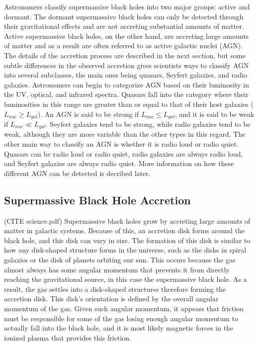 \documentclass[12pt]{article}
\begin{document}
Astronomers classify supermassive black holes into two major groups: active and
dormant.  The dormant supermassive black holes can only be detected through
their gravitational effects and are not accreting substantial amounts of matter.
Active supermassive black holes, on the other hand, are accreting large amounts
of matter and as a result are often referred to as active galactic nuclei (AGN).
The details of the accretion process are described in the next section, but some
subtle differences in the observed accretion gives scientists ways to classify
AGN into several subclasses, the main ones being quasars, Seyfert galaxies, and
radio galaxies.  Astronomers can begin to categorize AGN based on their
luminosity in the UV, optical, and infrared spectra.  Quasars fall into the
category where their luminosities in this range are greater than or equal to
that of their host galaxies ($L_{nuc} \ge L_{gal}$).  An AGN is said to be
strong if $L_{nuc} \le L_{gal}$, and it is said to be weak if $L_{nuc} \ll
L_{gal}$.  Seyfert galaxies tend to be strong, while radio galaxies tend to be
weak, although they are more variable than the other types in this regard.  The
other main way to classify an AGN is whether it is radio loud or radio quiet.
Quasars can be radio loud or radio quiet, radio galaxies are always radio loud,
and Seyfert galaxies are always radio quiet.  More information on how these
different AGN can be detected is decribed later.


\subsection{Supermassive Black Hole Accretion}
(CITE science.pdf)
Supermassive black holes grow by accreting large amounts of matter in
galactic systems.  Because of this, an accretion disk forms around the black
hole, and this disk can vary in size.  The formation of this disk is similar
to how any disk-shaped structure forms in the universe, such as the disks in
spiral galaxies or the disk of planets orbiting our sun.  This occurs
because the gas almost always has some angular momentum that prevents it
from directly reaching the gravitational source, in this case the
supermassive black hole.  As a result, the gas settles into a disk-shaped
structures therefore forming the accretion disk.  This disk's orientation is
defined by the overall angular momentum of the gas.  Given such angular
momentum, it appears that friction must be responsible for some of the gas
losing enough angular momentum to actually fall into the black hole, and it
is most likely magnetic forces in the ionized plasma that provides this
friction.
\end{document}
